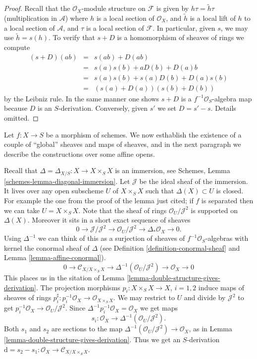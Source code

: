 \begin{proof}
Recall that the $\mathcal{O}_X$-module structure on $\mathcal{F}$
is given by $h \tau = \tilde h \tau$ (multiplication in $\mathcal{A}$)
where $h$ is a local section of $\mathcal{O}_X$, and
$\tilde h$ is a local lift of $h$ to a local
section of $\mathcal{A}$, and $\tau$ is a local section of $\mathcal{F}$.
In particular, given $s$, we may use $\tilde h = s(h)$.
To verify that $s + D$ is a homomorphism of sheaves of rings we
compute
\begin{eqnarray*}
(s + D)(ab) & = & s(ab) + D(ab) \\
& = & s(a)s(b) + aD(b) + D(a)b \\
& = & s(a) s(b) + s(a)D(b) + D(a)s(b) \\
& = & (s(a) + D(a))(s(b) + D(b))
\end{eqnarray*}
by the Leibniz rule. In the same manner one shows
$s + D$ is a $f^{-1}\mathcal{O}_S$-algebra
map because $D$ is an $S$-derivation. Conversely, given $s'$ we set
$D = s' - s$. Details omitted.
\end{proof}

\noindent
Let $f : X \to S$ be a morphism of schemes.
We now esthablish the existence of a couple of ``global'' sheaves
and maps of sheaves, and in the next paragraph we describe
the constructions over some affine opens.

\medskip\noindent
Recall that $\Delta = \Delta_{X/S} : X \to X \times_S X$
is an immersion, see Schemes, Lemma \ref{schemes-lemma-diagonal-immersion}.
Let $\mathcal{J}$ be the ideal sheaf of the immersion.
It lives over any open subscheme $U$ of $X \times_S X$
such that $\Delta(X) \subset U$ is closed. For example the one from
the proof of the lemma just cited;
if $f$ is separated then we can take $U = X \times_S X$.
Note that the sheaf of rings $\mathcal{O}_U/\mathcal{J}^2$
is supported on $\Delta(X)$. Moreover it sits in a
short exact sequence of sheaves
$$
0 \to \mathcal{J}/\mathcal{J}^2
\to \mathcal{O}_U/\mathcal{J}^2
\to \Delta_*\mathcal{O}_X
\to 0.
$$
Using $\Delta^{-1}$ we can think of this as a surjection of
sheaves of $f^{-1}\mathcal{O}_S$-algebras with kernel the
conormal sheaf of $\Delta$ (see Definition \ref{definition-conormal-sheaf}
and Lemma \ref{lemma-affine-conormal}).
$$
0 \to \mathcal{C}_{X/X\times_SX}
\to \Delta^{-1}(\mathcal{O}_U/\mathcal{J}^2)
\to \mathcal{O}_X
\to 0
$$
This places us in the sitation of
Lemma \ref{lemma-double-structure-gives-derivation}.
The projection morphisms $p_i : X \times_S X \to X$, $i = 1, 2$ induce
maps of sheaves of rings
$p_i^\sharp : p_i^{-1}\mathcal{O}_X \to \mathcal{O}_{X\times_S X}$.
We may restrict to $U$ and divide by $\mathcal{J}^2$ to get
$p_i^{-1}\mathcal{O}_X \to \mathcal{O}_U/\mathcal{J}^2$.
Since $\Delta^{-1}p_i^{-1}\mathcal{O}_X = \mathcal{O}_X$
we get maps
$$
s_i : \mathcal{O}_X \to \Delta^{-1}(\mathcal{O}_U/\mathcal{J}^2).
$$
Both $s_1$ and $s_2$ are sections to the map
$\Delta^{-1}(\mathcal{O}_U/\mathcal{J}^2) \to \mathcal{O}_X$,
as in Lemma \ref{lemma-double-structure-gives-derivation}.
Thus we get an $S$-derivation
$\text{d} = s_2 - s_1 : \mathcal{O}_X \to \mathcal{C}_{X/X\times_SX}$.

